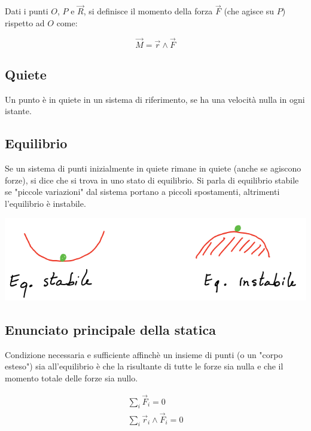 \documentclass{subfiles}
\begin{document}
\noindent
Dati i punti $O$, $P$ e $\vec{R}$, si definisce il momento della forza $\vec{F}$ (che agisce su $P$) rispetto ad $O$ come:

$$
\vec{M} = \vec{r} \wedge \vec{F}
$$

\subsection{Quiete}

Un punto è in quiete in un sistema di riferimento, se ha una velocità nulla in ogni istante.

\subsection{Equilibrio}

Se un sistema di punti inizialmente in quiete rimane in quiete (anche se agiscono forze), si dice che si trova in uno stato di equilibrio.
Si parla di equilibrio stabile se "piccole variazioni" dal sistema portano a piccoli spostamenti, altrimenti l'equilibrio è instabile.

\includegraphics[width=\columnwidth]{equilibrio-stabile-e-instabile}

\subsection{Enunciato principale della statica}

Condizione necessaria e sufficiente affinchè un insieme di punti (o un "corpo esteso") sia all'equilibrio è che la risultante di tutte le forze sia nulla e che il momento totale delle forze sia nullo.

$$
\begin{matrix}
\sum_i \vec{F}_i = 0 \\
\sum_i \vec{r}_i \wedge \vec{F}_i = 0
\end{matrix}
$$
\end{document}
